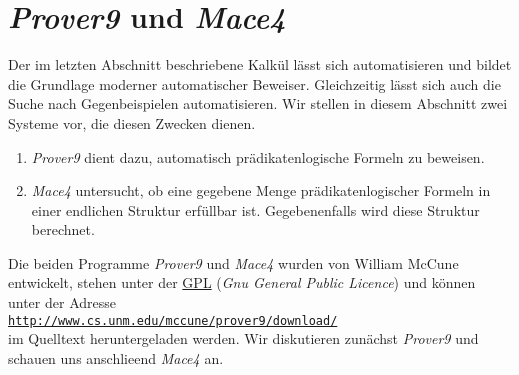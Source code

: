\section{\textsl{Prover9} und \textsl{Mace4}}
Der im letzten Abschnitt beschriebene Kalk\"{u}l l\"{a}sst sich automatisieren und bildet die Grundlage moderner
automatischer Beweiser.  Gleichzeitig l\"{a}sst sich auch die Suche nach Gegenbeispielen automatisieren.
Wir stellen in diesem Abschnitt zwei Systeme vor, die diesen Zwecken dienen.
\begin{enumerate}
\item \textsl{Prover9} dient dazu, automatisch pr\"{a}dikatenlogische Formeln zu beweisen.
\item \textsl{Mace4} untersucht, ob eine gegebene Menge pr\"{a}dikatenlogischer Formeln in einer endlichen
  Struktur erf\"{u}llbar ist.  Gegebenenfalls wird diese Struktur berechnet.
\end{enumerate}
Die beiden Programme \textsl{Prover9} und \textsl{Mace4} wurden von William McCune \cite{mccune:2010} 
entwickelt, stehen unter der \href{http://www.gnu.org/licenses/gpl.html}{GPL} (\emph{Gnu General
  Public Licence}) und k\"{o}nnen unter der Adresse 
\\[0.2cm]
\hspace*{1.3cm}
\href{http://www.cs.unm.edu/~mccune/prover9/download/}{\texttt{http://www.cs.unm.edu/mccune/prover9/download/}}
\\[0.2cm]
im Quelltext heruntergeladen werden.  Wir diskutieren zun\"{a}chst \textsl{Prover9} und schauen uns anschlie\3end
\textsl{Mace4} an.

